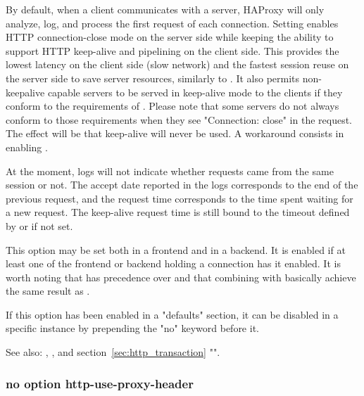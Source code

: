   By default, when a client communicates with a server, HAProxy will only
  analyze, log, and process the first request of each connection. Setting
   enables HTTP connection-close mode on the server
  side while keeping the ability to support HTTP keep-alive and pipelining on
  the client side.  This provides the lowest latency on the client side (slow
  network) and the fastest session reuse on the server side to save server
  resources, similarly to . It also permits non-keepalive
  capable servers to be served in keep-alive mode to the clients if they
  conform to the requirements of . Please note that some servers do not
  always conform to those requirements when they see "Connection: close" in the
  request. The effect will be that keep-alive will never be used. A workaround
  consists in enabling .

  At the moment, logs will not indicate whether requests came from the same
  session or not. The accept date reported in the logs corresponds to the end
  of the previous request, and the request time corresponds to the time spent
  waiting for a new request. The keep-alive request time is still bound to the
  timeout defined by  or  if
  not set.

  This option may be set both in a frontend and in a backend. It is enabled if
  at least one of the frontend or backend holding a connection has it enabled.
  It is worth noting that  has precedence over 
  and that combining  with 
  basically achieve the same result as .

  If this option has been enabled in a "defaults" section, it can be disabled
  in a specific instance by prepending the "no" keyword before it.


See also: , ,
              and section~\ref{sec:http_transaction} "".

\subsubsection[http-use-proxy-header]{}
\subsubsection*{no option http-use-proxy-header}

